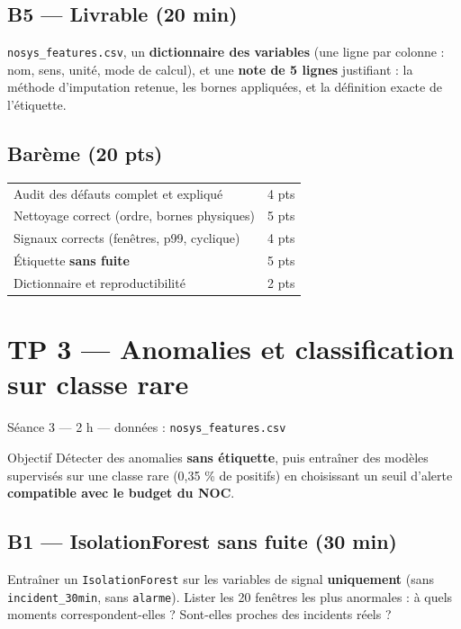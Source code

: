 \documentclass[11pt,a4paper]{article}
\newcommand{\py}[1]{\texttt{\small #1}}
\newcommand{\file}[1]{\texttt{\small #1}}
\begin{document}
\subsection*{B5 --- Livrable (20 min)}
\begin{rendre}
\file{nosys\_features.csv}, un \textbf{dictionnaire des variables}
(une ligne par colonne : nom, sens, unité, mode de calcul), et une
\textbf{note de 5 lignes} justifiant : la méthode d'imputation retenue,
les bornes appliquées, et la définition exacte de l'étiquette.
\end{rendre}

\subsection*{Barème (20 pts)}
\begin{center}\small
\begin{tabular}{@{}p{11.2cm}c@{}}
\toprule
Audit des défauts complet et expliqué & 4 pts\\
Nettoyage correct (ordre, bornes physiques) & 5 pts\\
Signaux corrects (fenêtres, p99, cyclique) & 4 pts\\
Étiquette \textbf{sans fuite} & 5 pts\\
Dictionnaire et reproductibilité & 2 pts\\
\bottomrule
\end{tabular}
\end{center}

\newpage
\section*{TP 3 --- Anomalies et classification sur classe rare}
{\small\color{grisdoux}Séance 3 --- 2 h --- données : \file{nosys\_features.csv}}

\begin{obj}{Objectif}
Détecter des anomalies \textbf{sans étiquette}, puis entraîner des modèles
supervisés sur une classe rare (0,35 \% de positifs) en choisissant un seuil
d'alerte \textbf{compatible avec le budget du NOC}.
\end{obj}

\subsection*{B1 --- IsolationForest sans fuite (30 min)}
Entraîner un \py{IsolationForest} sur les variables de signal
\textbf{uniquement} (sans \file{incident\_30min}, sans \file{alarme}).
Lister les 20 fenêtres les plus anormales : à quels moments correspondent-elles ?
Sont-elles proches des incidents réels ?
\end{document}

